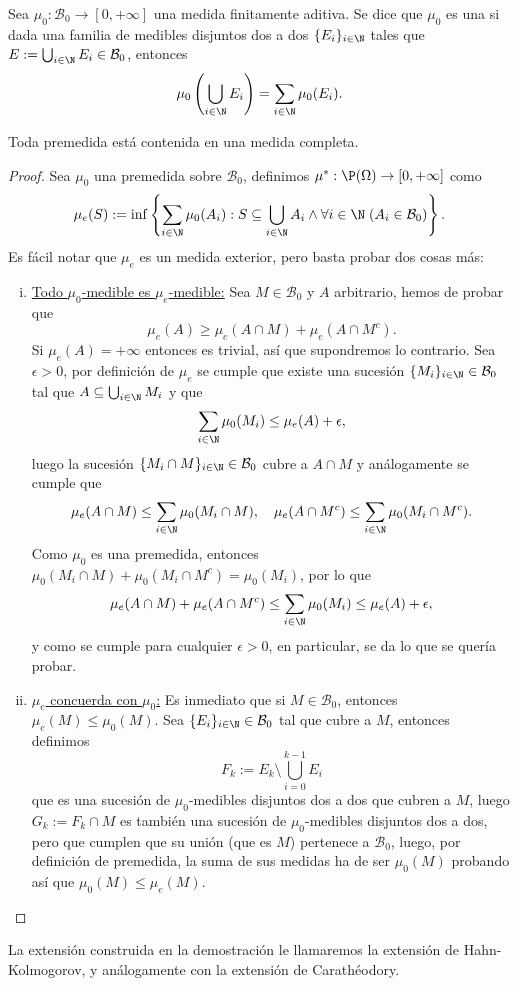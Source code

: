 \begin{mydef}
	Sea $\mu_0\colon \mathcal{B}_0 \to [0,+\infty]$ una medida finitamente aditiva.
	Se dice que $\mu_0$ es una  si dada una familia de medibles disjuntos dos a dos $\{ E_i \}_{i\in\N}$
	tales que $E := \bigcup_{i\in\N} E_i \in \mathcal{B}_0$, entonces
	$$ \mu_0 \left( \bigcup_{i\in\N} E_i \right) = \sum_{i\in\N} \mu_0(E_i). $$
\end{mydef}

\begin{thmi}
	Toda premedida está contenida en una medida completa.
\end{thmi}
\begin{proof}
	Sea $\mu_0$ una premedida sobre $\mathcal{B}_0$, definimos $\mu^* : \P(\Omega) \to [0,+\infty]$ como
	$$ \mu_e(S) := \inf \left\{ \sum_{i\in\N}\mu_0(A_i) : S\subseteq\bigcup_{i\in\N} A_i \wedge \forall i\in\N\;(A_i\in\mathcal{B}_0) \right\}. $$
	Es fácil notar que $\mu_e$ es un medida exterior, pero basta probar dos cosas más:

	\begin{enumerate}[i)]
		\item \underline{Todo $\mu_0$-medible es $\mu_e$-medible:}
			Sea $M\in\mathcal{B}_0$ y $A$ arbitrario, hemos de probar que
			$$ \mu_e(A) \ge \mu_e(A\cap M) + \mu_e(A\cap M^c). $$
			Si $\mu_e(A) = +\infty$ entonces es trivial, así que supondremos lo contrario.
			Sea $\epsilon > 0$, por definición de $\mu_e$ se cumple que existe una sucesión $\{M_i\}_{i\in\N} \in \mathcal{B}_0$ tal que $A\subseteq\bigcup_{i\in\N} M_i$ y que
			$$ \sum_{i\in\N} \mu_0(M_i) \le \mu_e(A) + \epsilon, $$
			luego la sucesión $\{ M_i\cap M \}_{i\in\N} \in \mathcal{B}_0$ cubre a $A\cap M$ y análogamente se cumple que
			$$ \mu_e(A\cap M) \le \sum_{i\in\N} \mu_0(M_i\cap M),\quad \mu_e(A\cap M^c) \le \sum_{i\in\N} \mu_0(M_i\cap M^c). $$
			Como $\mu_0$ es una premedida, entonces $\mu_0(M_i\cap M) + \mu_0(M_i\cap M^c) = \mu_0(M_i)$, por lo que
			$$ \mu_e(A\cap M) + \mu_e(A\cap M^c) \le \sum_{i\in\N} \mu_0(M_i) \le \mu_e(A) + \epsilon, $$
			y como se cumple para cualquier $\epsilon > 0$, en particular, se da lo que se quería probar.

		\item \underline{$\mu_e$ concuerda con $\mu_0$:} 
			Es inmediato que si $M\in\mathcal{B}_0$, entonces $\mu_e(M) \le \mu_0(M)$.
			Sea $\{E_i\}_{i\in\N} \in \mathcal{B}_0$ tal que cubre a $M$, entonces definimos
			$$ F_k := E_k \setminus \bigcup_{i=0}^{k-1} E_i $$
			que es una sucesión de $\mu_0$-medibles disjuntos dos a dos que cubren a $M$, luego $G_k := F_k\cap M$ es
			también una sucesión de $\mu_0$-medibles disjuntos dos a dos, pero que cumplen que su unión (que es $M$)
			pertenece a $\mathcal{B}_0$, luego, por definición de premedida, la suma de sus medidas ha de ser $\mu_0(M)$
			probando así que $\mu_0(M) \le \mu_e(M)$. \qedhere
	\end{enumerate}
\end{proof}
La extensión construida en la demostración le llamaremos la extensión de Hahn-Kolmogorov, y análogamente con la extensión de Carathéodory.

